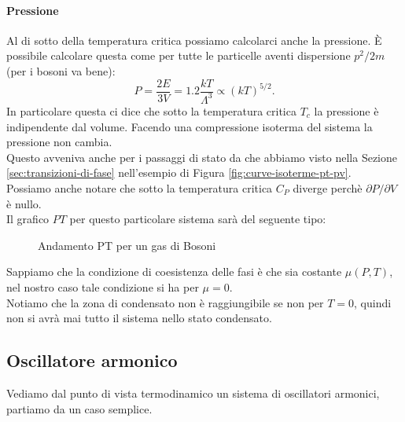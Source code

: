 \paragraph{Pressione}
Al di sotto della temperatura critica possiamo calcolarci anche la pressione. È possibile calcolare questa come per tutte le particelle aventi dispersione $p^2 /2m$ (per i bosoni va bene):
 \[
	 P = \frac{2E}{3V} = 1.2 \frac{kT}{\Lambda ^3} \propto \left( kT \right) ^{5 /2} 
.\] 
In particolare questa ci dice che sotto la temperatura critica $T_{c}$ la pressione è indipendente dal volume. Facendo una compressione isoterma del sistema la pressione non cambia.\\ 
Questo avveniva anche per i passaggi di stato da che abbiamo visto nella Sezione \ref{sec:transizioni-di-fase} nell'esempio di Figura \ref{fig:curve-isoterme-pt-pv}. \\
Possiamo anche notare che sotto la temperatura critica $C_{P}$ diverge perchè $\partial P /\partial V$ è nullo.\\
Il grafico $PT$ per questo particolare sistema sarà del seguente tipo:
\begin{figure}[ht]
    \centering
    \caption{Andamento PT per un gas di Bosoni}
    \label{fig:andamento-pt-per-un-gas-di-bosoni}
\end{figure}
Sappiamo che la condizione di coesistenza delle fasi è che sia costante $\mu ( P,T)$, nel nostro caso tale condizione si ha per $\mu = 0$.\\
Notiamo che la zona di condensato non è raggiungibile se non per $T= 0$, quindi non si avrà mai tutto il sistema nello stato condensato.

\subsection{Oscillatore armonico}%
Vediamo dal punto di vista termodinamico un sistema di oscillatori armonici, partiamo da un caso semplice.
